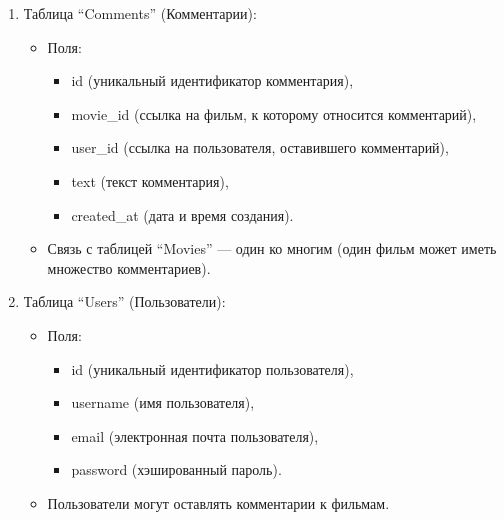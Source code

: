 \begin{enumerate}
\begin{itemize}
        \item Поля: 
        \begin{itemize}
            \item id (уникальный идентификатор тега),
            \item name (название тега).
        \end{itemize}
        \item Также связана с таблицей “Movies” через промежуточную таблицу.
    \end{itemize}
    \item Таблица “Comments” (Комментарии):
    \begin{itemize}
        \item Поля: 
        \begin{itemize}
            \item id (уникальный идентификатор комментария),
            \item movie\_id (ссылка на фильм, к которому относится комментарий),
            \item user\_id (ссылка на пользователя, оставившего комментарий),
            \item text (текст комментария),
            \item created\_at (дата и время создания).
        \end{itemize}
        \item Связь с таблицей “Movies” — один ко многим (один фильм может иметь множество комментариев).
    \end{itemize}
    \item Таблица “Users” (Пользователи):
    \begin{itemize}
        \item Поля: 
        \begin{itemize}
            \item id (уникальный идентификатор пользователя),
            \item username (имя пользователя),
            \item email (электронная почта пользователя),
            \item password (хэшированный пароль).
        \end{itemize}
        \item Пользователи могут оставлять комментарии к фильмам.
    \end{itemize}
\end{enumerate}

